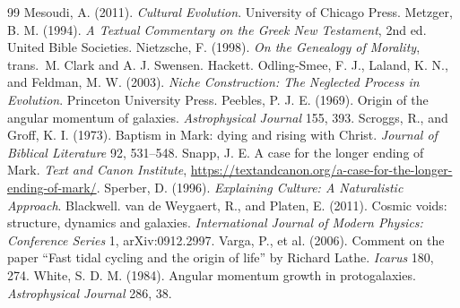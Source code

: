 \documentclass[11pt]{article}
\begin{document}
\begin{thebibliography}{99}
 Mesoudi, A. (2011). \emph{Cultural Evolution}. University of Chicago Press.
 Metzger, B. M. (1994). \emph{A Textual Commentary on the Greek New Testament}, 2nd ed. United Bible Societies.
 Nietzsche, F. (1998). \emph{On the Genealogy of Morality}, trans.\ M. Clark and A. J. Swensen. Hackett.
 Odling-Smee, F. J., Laland, K. N., and Feldman, M. W. (2003). \emph{Niche Construction: The Neglected Process in Evolution}. Princeton University Press.
 Peebles, P. J. E. (1969). Origin of the angular momentum of galaxies. \emph{Astrophysical Journal} 155, 393.
 Scroggs, R., and Groff, K. I. (1973). Baptism in Mark: dying and rising with Christ. \emph{Journal of Biblical Literature} 92, 531--548.
 Snapp, J. E. A case for the longer ending of Mark. \emph{Text and Canon Institute}, \url{https://textandcanon.org/a-case-for-the-longer-ending-of-mark/}.
 Sperber, D. (1996). \emph{Explaining Culture: A Naturalistic Approach}. Blackwell.
 van de Weygaert, R., and Platen, E. (2011). Cosmic voids: structure, dynamics and galaxies. \emph{International Journal of Modern Physics: Conference Series} 1, arXiv:0912.2997.
 Varga, P., et al. (2006). Comment on the paper ``Fast tidal cycling and the origin of life'' by Richard Lathe. \emph{Icarus} 180, 274.
 White, S. D. M. (1984). Angular momentum growth in protogalaxies. \emph{Astrophysical Journal} 286, 38.
\end{thebibliography}
\end{document}
